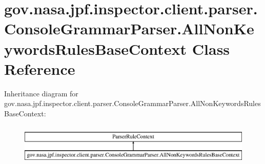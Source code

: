 \hypertarget{classgov_1_1nasa_1_1jpf_1_1inspector_1_1client_1_1parser_1_1_console_grammar_parser_1_1_all_non_keywords_rules_base_context}{}\section{gov.\+nasa.\+jpf.\+inspector.\+client.\+parser.\+Console\+Grammar\+Parser.\+All\+Non\+Keywords\+Rules\+Base\+Context Class Reference}
\label{classgov_1_1nasa_1_1jpf_1_1inspector_1_1client_1_1parser_1_1_console_grammar_parser_1_1_all_non_keywords_rules_base_context}
Inheritance diagram for gov.\+nasa.\+jpf.\+inspector.\+client.\+parser.\+Console\+Grammar\+Parser.\+All\+Non\+Keywords\+Rules\+Base\+Context\+:\begin{figure}[H]
\begin{center}
\leavevmode
\includegraphics[height=2.000000cm]{classgov_1_1nasa_1_1jpf_1_1inspector_1_1client_1_1parser_1_1_console_grammar_parser_1_1_all_non_keywords_rules_base_context}
\end{center}
\end{figure}
